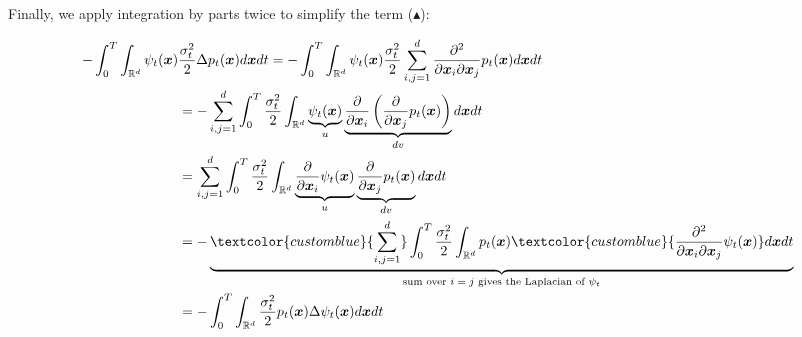 \documentclass{article}
\newcommand{\bluetext}[1]{\textcolor{customblue}{#1}}
\begin{document}
Finally, we apply integration by parts twice to simplify the term ($\blacktriangle$):
\begin{small}
\begin{align}
    -\int_0^T\int_{\mathbb{R}^d}\psi_t (\boldsymbol{x})&\frac{\sigma_t^2}{2}\Delta p_t(\boldsymbol{x})d\boldsymbol{x}dt=- \int_0^T\int_{\mathbb{R}^d}\psi_t (\boldsymbol{x}) \frac{\sigma_t^2}{2}\sum_{i,j=1}^d\frac{\partial^2}{\partial \boldsymbol{x}_i\partial \boldsymbol{x}_j}p_t(\boldsymbol{x})d\boldsymbol{x}dt\nonumber\\
    &=- \sum_{i,j=1}^d\int_0^T\frac{\sigma_t^2}{2}\int_{\mathbb{R}^d}\underbrace{\psi_t (\boldsymbol{x})}_{u}\underbrace{\frac{\partial}{\partial \boldsymbol{x}_i}\left(\frac{\partial}{\partial \boldsymbol{x}_j}p_t(\boldsymbol{x})\right)}_{dv}d\boldsymbol{x}dt\nonumber\\
    &= \sum_{i,j=1}^d\int_0^T\frac{\sigma_t^2}{2}\int_{\mathbb{R}^d}\underbrace{\frac{\partial}{\partial \boldsymbol{x}_i}\psi_t (\boldsymbol{x})}_{u}\underbrace{\frac{\partial}{\partial \boldsymbol{x}_j}p_t(\boldsymbol{x})}_{dv}d\boldsymbol{x}dt\nonumber\\
    &=- \underbrace{\bluetext{\sum_{i,j=1}^d}\int_0^T\frac{\sigma_t^2}{2}\int_{\mathbb{R}^d}p_t(\boldsymbol{x})\bluetext{\frac{\partial^2}{\partial \boldsymbol{x}_i\partial \boldsymbol{x}_j}\psi_t (\boldsymbol{x})}d\boldsymbol{x}dt}_{\text{sum over $i=j$ gives the Laplacian of }\psi_t}\nonumber\\
    &=-\int_0^T\int_{\mathbb{R}^d}\frac{\sigma_t^2}{2}p_t(\boldsymbol{x})\Delta \psi_t (\boldsymbol{x})d\boldsymbol{x}dt
\end{align}
\end{small}
\end{document}
